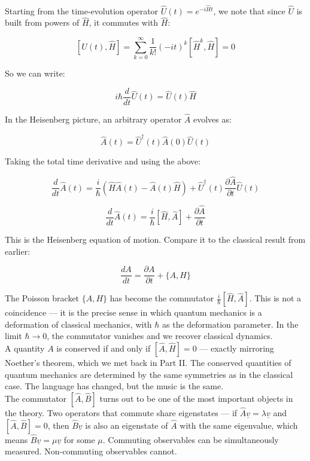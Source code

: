 \documentclass[krantz1,ChapterTOCs]{krantz}
\begin{document}
Starting from the time-evolution operator $\hat{U}(t) = 
e^{-i\hat{H}t}$, we note that since $\hat{U}$ is built from 
powers of $\hat{H}$, it commutes with $\hat{H}$:

$$[\hat{U}(t), \hat{H}] = 
\sum_{k=0}^{\infty}\frac{1}{k!}(-it)^k
\left[\hat{H}^k, \hat{H}\right] = 0$$

So we can write:

$$\boxed{i\hbar\frac{d}{dt}\hat{U}(t) = \hat{U}(t)\hat{H}}$$

In the Heisenberg picture, an arbitrary operator $\hat{A}$ 
evolves as:

$$\boxed{\hat{A}(t) = \hat{U}^\dagger(t)\hat{A}(0)\hat{U}(t)}$$

Taking the total time derivative and using the above:

$$\frac{d}{dt}\hat{A}(t) = 
\frac{i}{\hbar}\left(\hat{H}\hat{A}(t) - 
\hat{A}(t)\hat{H}\right) + 
\hat{U}^\dagger(t)\frac{\partial\hat{A}}{\partial t}\hat{U}(t)$$

$$\boxed{\frac{d}{dt}\hat{A}(t) = 
\frac{i}{\hbar}[\hat{H}, \hat{A}] + 
\frac{\partial\hat{A}}{\partial t}}$$

This is the Heisenberg equation of motion. Compare it to the 
classical result from earlier:

$$\frac{dA}{dt} = \frac{\partial A}{\partial t} + \{A, H\}$$

The Poisson bracket $\{A, H\}$ has become the commutator 
$\frac{i}{\hbar}[\hat{H}, \hat{A}]$. This is not a coincidence 
--- it is the precise sense in which quantum mechanics is a 
deformation of classical mechanics, with $\hbar$ as the 
deformation parameter. In the limit $\hbar \to 0$, the commutator 
vanishes and we recover classical dynamics.\\

A quantity $A$ is conserved if and only if $[\hat{A}, \hat{H}] 
= 0$ --- exactly mirroring Noether's theorem, which we met back 
in Part II. The conserved quantities of quantum mechanics are 
determined by the same symmetries as in the classical case. The 
language has changed, but the music is the same.\\

The commutator $[\hat{A}, \hat{B}]$ turns out to be one of the 
most important objects in the theory. Two operators that commute 
share eigenstates --- if $\hat{A}\underline{v} = 
\lambda\underline{v}$ and $[\hat{A}, \hat{B}] = 0$, then 
$\hat{B}\underline{v}$ is also an eigenstate of $\hat{A}$ with 
the same eigenvalue, which means $\hat{B}\underline{v} = 
\mu\underline{v}$ for some $\mu$. Commuting observables can be 
simultaneously measured. Non-commuting observables cannot.\\
\end{document}
